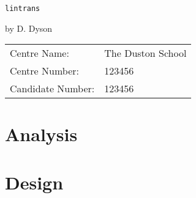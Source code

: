 \documentclass[a4paper]{article}
\begin{document}

\begin{center}
	\vspace*{6.5cm}

	\Huge{\texttt{lintrans}}

	\vspace{0.8cm}

	\Large{by D. Dyson}

	\vfill
\end{center}

\large{
\begin{tabular}{ll}
Centre Name:& The Duston School\\
Centre Number:& 123456\\
Candidate Number:& 123456
\end{tabular}
}

\thispagestyle{empty}
\newpage



\thispagestyle{fancy}
\cfoot{\thepage}

\tableofcontents
\newpage



\setlength{\parindent}{0em}
\setlength{\parskip}{1em}



\section{Analysis\label{section:analysis}}


\newpage

\section{Design\label{section:design}}




\newpage


\printbibliography

\end{document}
